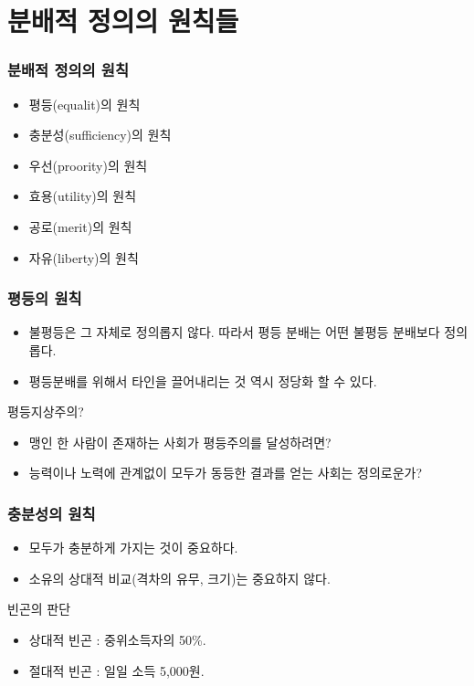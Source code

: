 \documentclass[aspectratio=169,xcolor=dvipsnames,handout]{beamer}
\begin{document}
\section{분배적 정의의 원칙들}
\begin{frame}[<+->]
\frametitle{분배적 정의의 원칙}
    \begin{itemize}
        \item 평등(equalit)의 원칙
        \item 충분성(sufficiency)의 원칙
        \item 우선(proority)의 원칙
        \item 효용(utility)의 원칙
        \item 공로(merit)의 원칙
        \item 자유(liberty)의 원칙
    \end{itemize}
\end{frame}

\begin{frame}[<+->]
\frametitle{평등의 원칙}
    \begin{itemize}
        \item 불평등은 그 자체로 정의롭지 않다. 따라서 평등 분배는 어떤 불평등 분배보다 정의롭다.
        \item 평등분배를 위해서 타인을 끌어내리는 것 역시 정당화 할 수 있다.
    \end{itemize}
    \begin{alertblock}{평등지상주의?}
    \begin{itemize}
        \item 맹인 한 사람이 존재하는 사회가 평등주의를 달성하려면?
        \item 능력이나 노력에 관계없이 모두가 동등한 결과를 얻는 사회는 정의로운가?
    \end{itemize}
    \end{alertblock}
\end{frame}

\begin{frame}[<+->]
\frametitle{충분성의 원칙}
    \begin{itemize}
        \item 모두가 충분하게 가지는 것이 중요하다.
        \item 소유의 상대적 비교(격차의 유무, 크기)는 중요하지 않다.
    \end{itemize}
    \begin{alertblock}{빈곤의 판단}
    \begin{itemize}
        \item 상대적 빈곤 : 중위소득자의 50\%.
        \item 절대적 빈곤 : 일일 소득 5,000원.
    \end{itemize}
    \end{alertblock}
\end{frame}
\end{document}
